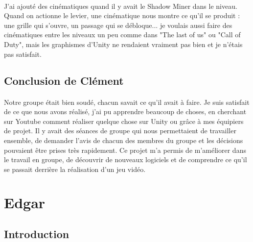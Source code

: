 \documentclass[titlepage, 13px, a4paper]{report}
\begin{document}
\paragraph*{} \hspace{0pt}
J'ai ajouté des cinématiques quand il y avait le Shadow Miner dans le niveau. 
Quand on actionne le levier, une cinématique nous montre ce qu'il se produit : une 
grille qui s'ouvre, un passage qui se débloque... je voulais aussi faire des cinématiques 
entre les niveaux un peu comme dans "The last of us" ou "Call of Duty", mais les graphismes 
d'Unity ne rendaient vraiment pas bien et je n'étais pas satisfait. \\

\subsection{Conclusion de Clément}
\paragraph*{} \hspace{0pt}
Notre groupe était bien soudé, chacun savait ce qu'il avait à faire. Je suis satisfait 
de ce que nous avons réalisé, j'ai pu apprendre beaucoup de choses, en cherchant sur 
Youtube comment réaliser quelque chose sur Unity ou grâce à mes équipiers de projet. 
Il y avait des séances de groupe qui nous permettaient de travailler ensemble, de demander 
l'avis de chacun des membres du groupe et les décisions pouvaient être prises très rapidement. 
Ce projet m'a permis de m'améliorer dans le travail en groupe, de découvrir de nouveaux 
logiciels et de comprendre ce qu'il se passait derrière la réalisation d'un jeu vidéo.  \

\newpage
\section{Edgar}

\subsection{Introduction}
\end{document}
